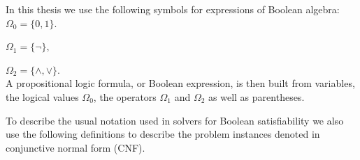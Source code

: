 \documentclass[a4paper, 12pt, bibliography=totoc]{scrartcl}
\begin{document}
In this thesis we use the following symbols for expressions of Boolean algebra:\\

${ \Omega _{0}=\{0 ,1 \}.}$ 

${\Omega _{1}=\{\lnot \},}$

${ \Omega _{2}= \{\land ,\lor \}.}$\\


A propositional logic formula, or Boolean expression, is then built from variables, the logical values $\Omega _{0}$, the operators $\Omega _{1}$ and $\Omega _{2}$ as well as parentheses.

To describe the usual notation used in solvers for Boolean satisfiability we also use the following definitions to describe the problem instances denoted in conjunctive normal form (CNF).
\end{document}
